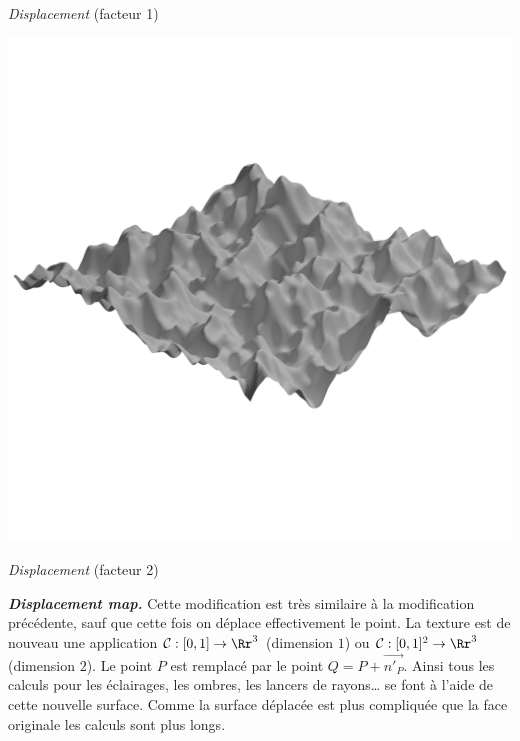 \documentclass[11pt,class=report,crop=false]{standalone}
\begin{document}
\begin{center}
\begin{minipage}{0.32\textwidth}
		
		\emph{Displacement} (facteur 1)
	\end{minipage}	
	\begin{minipage}{0.32\textwidth}
		\center
		\includegraphics[scale=\myscale,scale=0.13,trim={0 8cm 0 8cm},clip]{figures/texture-plan-bump-dis2}
		
		
		\emph{Displacement} (facteur 2)	
	\end{minipage}	
\end{center}

\medskip

\textbf{\emph{Displacement map.}}
Cette modification est très similaire à la modification précédente, sauf que cette fois on déplace effectivement le point.
La texture est de nouveau une application $\mathcal{C} : [0,1] \to \Rr^3$ (dimension $1$) ou $\mathcal{C} : [0,1]^2 \to \Rr^3$ (dimension $2$).
Le point $P$ est remplacé par le point $Q = P + \vec{n'_P}$.
Ainsi tous les calculs pour les éclairages, les ombres, les lancers de rayons\ldots{} se font à l'aide de cette nouvelle surface. Comme la surface déplacée est plus compliquée que la face originale les calculs sont plus longs.
\end{document}
